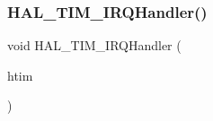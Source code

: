 \subsubsection{\texorpdfstring{H\+A\+L\+\_\+\+T\+I\+M\+\_\+\+I\+R\+Q\+Handler()}{HAL\_TIM\_IRQHandler()}}
{\footnotesize\ttfamily void H\+A\+L\+\_\+\+T\+I\+M\+\_\+\+I\+R\+Q\+Handler (\begin{DoxyParamCaption}\item[{\hyperlink{struct_t_i_m___handle_type_def}{T\+I\+M\+\_\+\+Handle\+Type\+Def} $\ast$}]{htim }\end{DoxyParamCaption})}


